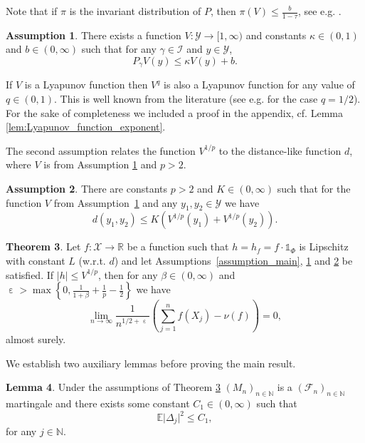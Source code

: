\documentclass[12pt]{article}
\theoremstyle{definition}
\newtheorem{thm}{Theorem}[section]
\newtheorem{lem}[thm]{Lemma}
\newtheorem{ass}[thm]{Assumption}
\newcommand{\N}{\mathbb{N}}
\newcommand{\E}{\mathbb{E}}
\newcommand{\R}{\mathbb{R}}
\newcommand{\cX}{\mathcal{X}}
\newcommand{\cY}{\mathcal{Y}}
\DeclareMathOperator{\eps}{\varepsilon}
\begin{document}
Note that if $\pi$ is the invariant distribution of $P$, then $\pi(V) \leq \frac{b}{1-\tau}$, see e.g. \cite[Proposition 4.24]{hairer2006ergodic}.
\begin{ass}\label{ass:Lyapunov_existence}
	There exists a function $V \colon \cY \to [1, \infty)$ and constants $\kappa \in (0,1)$ and $b \in (0,\infty)$ such that for any $\gamma \in \mathcal{I}$ and $y \in \cY$,  
	\[
	P_\gamma V(y) \leq \kappa V(y) +b.
	\]
\end{ass}

If $V$ is a Lyapunov function then $V^{q}$ is also a Lyapunov function for any value of $q\in (0,1)$. 
This is well known from the literature (see e.g. \cite[Lemma 15.2.9]{meyn2012markov} for the case $q=1/2$).
For the sake of completeness we included a proof in the appendix, cf. Lemma \ref{lem:Lyapunov_function_exponent}. 

The second assumption relates the function $V^{1/p}$ to the distance-like function $d$, where $V$ is from Assumption \ref{ass:Lyapunov_existence} and $p>2$. 

\begin{ass}\label{ass:Lyapunov_bound}
	There are constants $p>2$ and $K \in (0, \infty)$  such that for the function $V$ from Assumption~\ref{ass:Lyapunov_existence} and any $y_1, y_2 \in \cY$ we have 
	\[
	d(y_1, y_2) \le K(V^{1/p}(y_1)+ V^{1/p}(y_2)).
	\]
\end{ass}



\begin{thm}\label{thm:limit_result_lyapunov}
	Let $f \colon \cX \to \R$ be a function such that $h = h_f = f \cdot \mathds{1}_\Phi$ is Lipschitz with constant $L$ (w.r.t. $d$) and 
	let Assumptions~\ref{assumption_main}, \ref{ass:Lyapunov_existence} and \ref{ass:Lyapunov_bound} be satisfied. 
	If $\vert h \vert \le V^{1/p}$, then for any $\beta \in (0,\infty)$ and $\eps > \max \left\{0,\frac{1}{1+\beta} + \frac{1}{p} - \frac{1}{2} \right\} $ we have 
	\[
	\lim_{n \to \infty} \frac{1}{n^{1/2+\eps}} \left( \sum_{j=1}^n f(X_j) - \nu(f)\right) =0, 
	\]
	almost surely. 
\end{thm}

We establish two auxiliary lemmas before proving the main result. 


\begin{lem}\label{lem:martingale_bound_lyapunov_condition}
	Under the assumptions of Theorem \ref{thm:limit_result_lyapunov} $(M_n)_{n \in \N}$ is a $(\mathcal{F}_n)_{n \in \N}$ martingale and there exists some constant $C_1 \in (0,\infty)$ such that
	\[
	\E	\vert \Delta_j \vert^2 \le C_1,
	\]
	for any $j \in \N$.
\end{lem}
\end{document}
